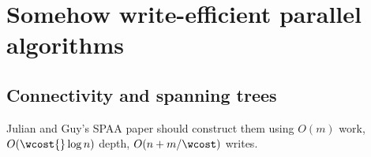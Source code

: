 \section{Somehow write-efficient parallel algorithms}

\subsection{Connectivity and spanning trees}

Julian and Guy's SPAA paper should construct them using $O(m)$ work, $O(\wcost{}\log n)$ depth, $O(n+m/\wcost)$ writes.


